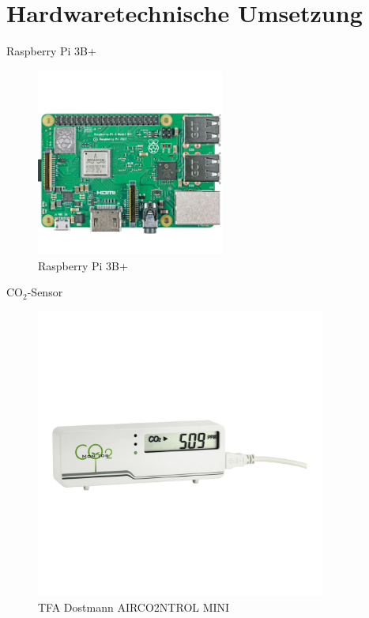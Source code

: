 \documentclass[10pt,ngerman]{beamer}
\begin{document}
\section{Hardwaretechnische Umsetzung}

\begin{frame}[fragile]{Raspberry Pi 3B+}
  \begin{figure}
    \centering
    \captionsetup{justification=centering}
    \includegraphics[width=0.55\textwidth]{pictures/RasPi.png}
    \caption{Raspberry Pi 3B+ \autocite{rasPi}}
  \end{figure}
\end{frame}

\begin{frame}[fragile]{CO$_2$-Sensor}
  \begin{figure}
    \centering
    \captionsetup{justification=centering}
    \includegraphics[trim={0 10cm 0 10cm},clip,width=0.85\textwidth]{pictures/co2monitor.png}
    \caption{TFA Dostmann AIRCO2NTROL MINI}
  \end{figure}
\end{frame}
\end{document}

